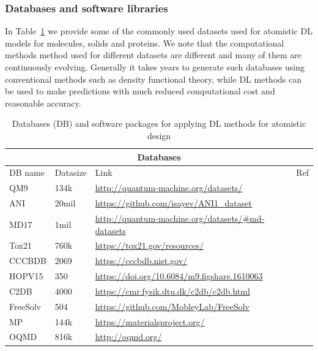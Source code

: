 \documentclass[pdflatex,sn-mathphys]{sn-jnl}%
\theoremstyle{thmstyleone}%
\theoremstyle{thmstyletwo}%
\theoremstyle{thmstylethree}%
\begin{document}
 
 \subsubsection{Databases and software libraries}
In Table~\ref{tab:atomistic-deep-learning} we provide some of the commonly used datasets used for atomistic DL models for molecules, solids and proteins. We note that the computational methods method used for different datasets are different and many of them are continuously evolving. Generally it takes years to generate such databases using conventional methods such as density functional theory, while DL methods can be used to make predictions with much reduced computational cost and reasonable accuracy.

\begin{table}[hbt!]

\begin{minipage}{174pt}
\caption{\label{tab:atomistic-deep-learning}Databases (DB) and software packages for applying DL methods for atomistic design}
\begin{tabular}{@{}llll@{}}
\toprule
\multicolumn{4}{c}{Databases} \\
\midrule
DB name & Datasize & Link & Ref\\
\midrule
QM9   &  134k   & \url{http://quantum-machine.org/datasets/} & \cite{ramakrishnan2014quantum}  \\
ANI   &  20mil  & \url{https://github.com/isayev/ANI1_dataset} & \cite{smith2017ani}  \\
MD17   &  1mil   & \url{http://quantum-machine.org/datasets/#md-datasets} & \cite{chmiela2017machine}  \\
Tox21   &  760k & \url{https://tox21.gov/resources/}   & \cite{thomas2018us}  \\
CCCBDB   &  2069 & \url{https://cccbdb.nist.gov/}   & \cite{russell2005nist}  \\
HOPV15   &  350   & \url{https://doi.org/10.6084/m9.figshare.1610063} & \cite{lopez2016harvard}  \\
C2DB   &  4000 & \url{https://cmr.fysik.dtu.dk/c2db/c2db.html}   & \cite{johnson2006nist}  \\
FreeSolv   &  504 & \url{https://github.com/MobleyLab/FreeSolv}   & \cite{mobley2014freesolv}  \\
MP   &  144k & \url{https://materialsproject.org/}   & \cite{jain2013commentary}  \\
OQMD   &  816k & \url{http://oqmd.org/}   & \cite{kirklin2015open}  \\

\end{tabular}
\end{minipage}
\end{table}
\end{document}
